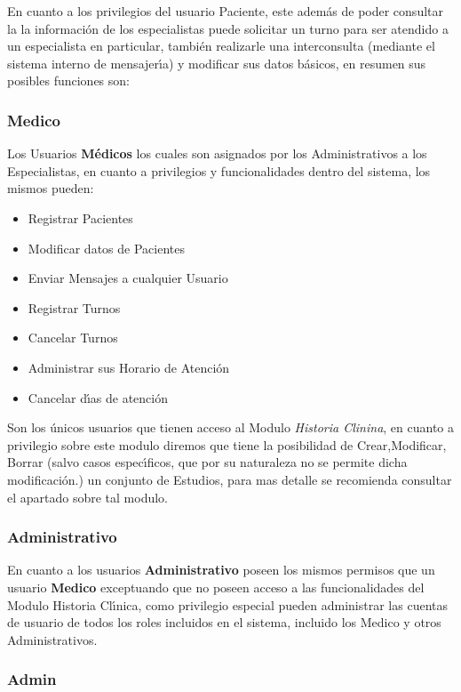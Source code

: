 En cuanto a los privilegios del usuario Paciente, este adem\'as de poder consultar la 
la informaci\'on de los especialistas puede solicitar un turno para ser atendido 
a un especialista en particular, tambi\'en realizarle una interconsulta (mediante
el sistema interno de mensajer\'{\i}a) y modificar sus datos b\'asicos, en resumen sus 
posibles funciones son:


\subsubsection{Medico}

Los Usuarios \textbf{M\'edicos} los cuales son asignados por los Administrativos a 
los Especialistas, en cuanto a privilegios y funcionalidades dentro del sistema, 
los mismos pueden:

\begin{itemize}
    \item Registrar Pacientes
    \item Modificar datos de Pacientes
    \item Enviar Mensajes a cualquier Usuario
    \item Registrar Turnos 
    \item Cancelar Turnos
    \item Administrar sus Horario de Atenci\'on
    \item Cancelar d\'{\i}as de atenci\'on
\end{itemize}

Son los \'unicos usuarios que tienen acceso al Modulo \textit{Historia Clinina}, en cuanto
a privilegio sobre este modulo diremos que tiene la posibilidad de Crear,Modificar,
Borrar (salvo casos espec\'{\i}ficos, que por su naturaleza no se permite dicha 
modificaci\'on.) un conjunto de Estudios, para mas detalle se recomienda consultar
el apartado sobre tal modulo.


\subsubsection{Administrativo}

En cuanto a los usuarios \textbf{Administrativo} poseen los mismos permisos que 
un usuario \textbf{Medico} exceptuando que no poseen acceso a las funcionalidades 
del Modulo Historia Cl\'{\i}nica, como privilegio especial pueden administrar las 
cuentas de usuario de todos los roles incluidos en el sistema, incluido los 
Medico y otros Administrativos.

\subsubsection{Admin}

